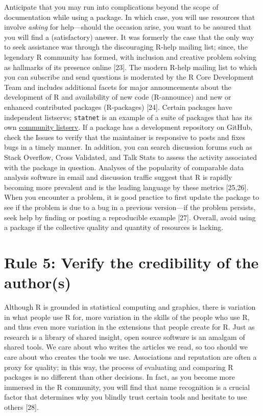 \documentclass[10pt,letterpaper]{article}
\begin{document}
Anticipate that you may run into complications beyond the scope of
documentation while using a package. In which case, you will use
resources that involve \emph{asking} for help---should the occasion
arise, you want to be assured that you will find a (satisfactory)
answer. It was formerly the case that the only way to seek assistance
was through the discouraging R-help mailing list; since, the legendary R
community has formed, with inclusion and creative problem solving as
hallmarks of its presence online {[}23{]}. The modern R-help mailing
list to which you can subscribe and send questions is moderated by the R
Core Development Team and includes additional facets for major
announcements about the development of R and availability of new code
(R-announce) and new or enhanced contributed packages (R-packages)
{[}24{]}. Certain packages have independent listservs; \texttt{statnet}
is an example of a suite of packages that has its own
\href{http://statnet.org/}{community listserv}. If a package has a
development repository on GitHub, check the Issues to verify that the
maintainer is responsive to posts and fixes bugs in a timely manner. In
addition, you can search discussion forums such as Stack Overflow, Cross
Validated, and Talk Stats to assess the activity associated with the
package in question. Analyses of the popularity of comparable data
analysis software in email and discussion traffic suggest that R is
rapidly becoming more prevalent and is the leading language by these
metrics {[}25,26{]}. When you encounter a problem, it is good practice
to first update the package to see if the problem is due to a bug in a
previous version---if the problem persists, seek help by finding or
posting a reproducible example {[}27{]}. Overall, avoid using a package
if the collective quality and quantity of resources is lacking.

\hypertarget{rule-5-verify-the-credibility-of-the-authors}{%
\section{Rule 5: Verify the credibility of the
author(s)}\label{rule-5-verify-the-credibility-of-the-authors}}

Although R is grounded in statistical computing and graphics, there is
variation in what people use R for, more variation in the skills of the
people who use R, and thus even more variation in the extensions that
people create for R. Just as research is a library of shared insight,
open source software is an amalgam of shared tools. We care about who
writes the articles we read, so too should we care about who creates the
tools we use. Associations and reputation are often a proxy for quality;
in this way, the process of evaluating and comparing R packages is no
different than other decisions. In fact, as you become more immersed in
the R community, you will find that name recognition is a crucial factor
that determines why you blindly trust certain tools and hesitate to use
others {[}28{]}.
\end{document}
